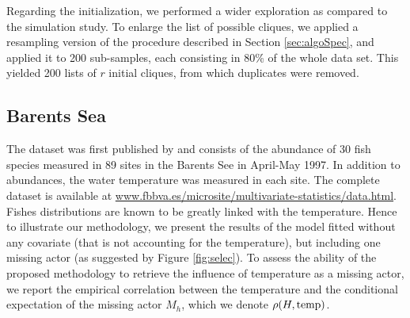 Regarding the initialization, we performed a wider exploration as compared to the simulation study. To enlarge the list of possible cliques, we applied a resampling version of the procedure described in Section \ref{sec:algoSpec}, and applied it to 200 sub-samples, each consisting in 80\% of the whole data set. This yielded 200 lists of $r$ initial cliques, from which duplicates were removed.

\subsection{Barents Sea}

The dataset was first published by \cite{FNA06} and consists of the abundance of 30 fish species measured in 89 sites in the Barents See in April-May 1997. In addition to abundances, the water temperature was measured in each site. The complete dataset is available at \url{www.fbbva.es/microsite/multivariate-statistics/data.html}. 
Fishes distributions are known to be greatly linked with the temperature. 
Hence to illustrate our methodology, 
we present the results of the model fitted without any covariate (that is not accounting for the temperature), but including one missing actor (as suggested by Figure \ref{fig:selec}). To assess the ability of the proposed methodology to retrieve the influence of temperature as a missing actor, we report the empirical correlation between the temperature and the conditional expectation of the missing actor $M_h$, which we denote ${\rho(H, \text{temp})}$.
 
